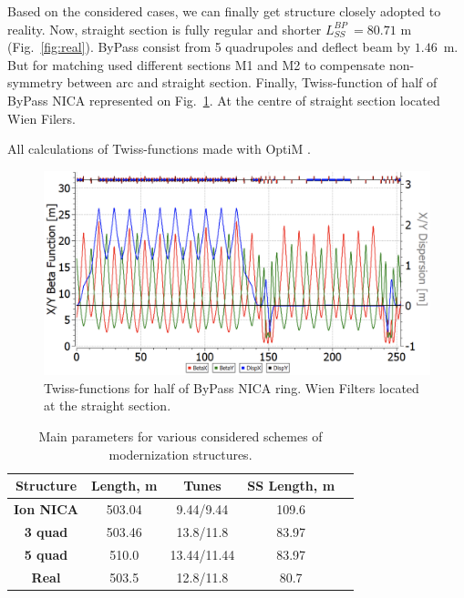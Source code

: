 \documentclass[a4paper,
               keeplastbox,   %
               ]{jacow}
\begin{document}
 \par Based on the considered cases, we can finally get structure closely adopted to reality. Now, straight section is fully regular and shorter $L^{BP}_{SS}~=80.71$ m (Fig.~\ref{fig:real}). ByPass consist from 5 quadrupoles and deflect beam by $1.46$~m. But for matching used different sections M1 and M2 to compensate non-symmetry between arc and straight section. Finally, Twiss-function of half of ByPass NICA represented on Fig.~\ref{fig:realTwiss}. At the centre of straight section located Wien Filers.
 \par All calculations of Twiss-functions made with OptiM \cite{OptiM}.

\begin{figure}[!htb]
   \centering
   \includegraphics*[width=1.\columnwidth]{img/MOPA072_f7-1}
   \caption{Twiss-functions for half of ByPass NICA ring. Wien Filters located at the straight section.}
   \label{fig:realTwiss}
\end{figure}
\begin{table}[!ht]
    \centering
    \caption{Main parameters for various considered schemes of modernization structures.}
    \begin{tabular}{|c||c|c|c|c|}
    \hline
        \textbf{Structure} & \textbf{Length, m} & \textbf{Tunes} & \textbf{SS Length, m} \\ \hline
        \textbf{Ion NICA} & 503.04 & 9.44/9.44 & 109.6  \\ 
        \textbf{3 quad} & 503.46 & 13.8/11.8 & 83.97  \\ 
        \textbf{5 quad} & 510.0 & 13.44/11.44 & 83.97  \\ 
        \textbf{Real} & 503.5 & 12.8/11.8 & 80.7 \\ \hline
    \end{tabular}
    \label{lengths}
\end{table}
\end{document}
